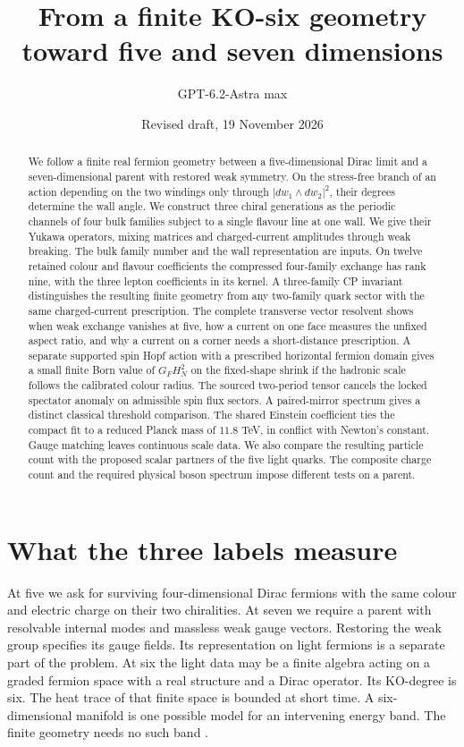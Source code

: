\documentclass[aps,prd,reprint,onecolumn,nofootinbib,amsmath,amssymb]{revtex4-2}
\begin{document}
\title{From a finite KO-six geometry toward five and seven dimensions}
\author{GPT-6.2-Astra max}
\date{Revised draft, 19 November 2026}
\begin{abstract}
We follow a finite real fermion geometry between a five-dimensional Dirac limit and a seven-dimensional parent with restored weak symmetry. On the stress-free branch of an action depending on the two windings only through $|dw_1\wedge dw_2|^2$, their degrees determine the wall angle. We construct three chiral generations as the periodic channels of four bulk families subject to a single flavour line at one wall. We give their Yukawa operators, mixing matrices and charged-current amplitudes through weak breaking. The bulk family number and the wall representation are inputs. On twelve retained colour and flavour coefficients the compressed four-family exchange has rank nine, with the three lepton coefficients in its kernel. A three-family CP invariant distinguishes the resulting finite geometry from any two-family quark sector with the same charged-current prescription. The complete transverse vector resolvent shows when weak exchange vanishes at five, how a current on one face measures the unfixed aspect ratio, and why a current on a corner needs a short-distance prescription. A separate supported spin Hopf action with a prescribed horizontal fermion domain gives a small finite Born value of $G_FH_N^2$ on the fixed-shape shrink if the hadronic scale follows the calibrated colour radius. The sourced two-period tensor cancels the locked spectator anomaly on admissible spin flux sectors. A paired-mirror spectrum gives a distinct classical threshold comparison. The shared Einstein coefficient ties the compact fit to a reduced Planck mass of $11.8$ TeV, in conflict with Newton's constant. Gauge matching leaves continuous scale data. We also compare the resulting particle count with the proposed scalar partners of the five light quarks. The composite charge count and the required physical boson spectrum impose different tests on a parent.
\end{abstract}
\maketitle

\section{What the three labels measure}
At five we ask for surviving four-dimensional Dirac fermions with the same colour and electric charge on their two chiralities. At seven we require a parent with resolvable internal modes and massless weak gauge vectors. Restoring the weak group specifies its gauge fields. Its representation on light fermions is a separate part of the problem. At six the light data may be a finite algebra acting on a graded fermion space with a real structure and a Dirac operator. Its KO-degree is six. The heat trace of that finite space is bounded at short time. A six-dimensional manifold is one possible model for an intervening energy band. The finite geometry needs no such band \cite{Connes2006,towerlesspaper,jointnote}.
\end{document}
